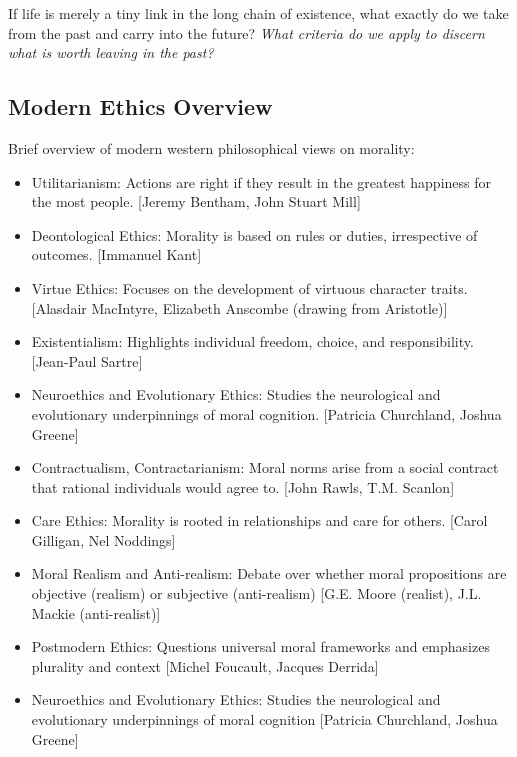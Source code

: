 \documentclass[11pt,a4]{article}
\begin{document}
    \par
    If life is merely a tiny link in the long chain of existence, what exactly do we take from the past and carry into the future? \textit{What criteria do we apply to discern what is worth leaving in the past?}

    \subsection{Modern Ethics Overview}

        Brief overview of modern western philosophical views on morality:

        \begin{itemize}
            \item Utilitarianism: Actions are right if they result in the greatest happiness for the most people. [Jeremy Bentham, John Stuart Mill]

            \item Deontological Ethics: Morality is based on rules or duties, irrespective of outcomes. [Immanuel Kant]
            \item Virtue Ethics: Focuses on the development of virtuous character traits. [Alasdair MacIntyre, Elizabeth Anscombe (drawing from Aristotle)]
            \item Existentialism: Highlights individual freedom, choice, and responsibility. [Jean-Paul Sartre]
            \item Neuroethics and Evolutionary Ethics:  Studies the neurological and evolutionary underpinnings of moral cognition. [Patricia Churchland, Joshua Greene]
            \item Contractualism, Contractarianism: Moral norms arise from a social contract that rational individuals
                  would agree to. [John Rawls, T.M. Scanlon]


            \item Care Ethics: Morality is rooted in relationships and care for others.
                [Carol Gilligan, Nel Noddings]

            \item Moral Realism and Anti-realism:
                 Debate over whether moral propositions are objective (realism)
                or subjective (anti-realism)
                [G.E. Moore (realist), J.L. Mackie (anti-realist)]

            \item Postmodern Ethics:
                 Questions universal moral frameworks and emphasizes plurality and context
                [Michel Foucault, Jacques Derrida]

            \item Neuroethics and Evolutionary Ethics:
                Studies the neurological and evolutionary underpinnings of moral cognition
                [Patricia Churchland, Joshua Greene]


        \end{itemize}
\end{document}

